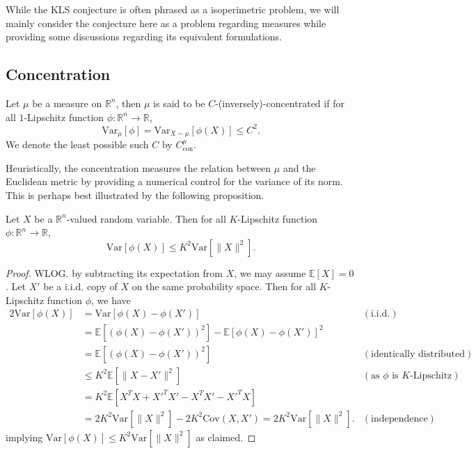 While the KLS conjecture is often phrased as a isoperimetric problem, we will mainly consider the 
conjecture here as a problem regarding measures while providing some discussions regarding its 
equivalent formulations. 

\subsection{Concentration}

\begin{definition}
  Let \(\mu\) be a measure on \(\mathbb{R}^n\), then \(\mu\) is said to be \(C\)-(inversely)-concentrated if
  for all \(1\)-Lipschitz function \(\phi : \mathbb{R}^n \to \mathbb{R}\), 
  \begin{equation}
    \text{Var}_\mu[\phi] = \text{Var}_{X \sim \mu}[\phi(X)] \le C^2.
  \end{equation}
  We denote the least possible such \(C\) by \(C^\mu_{\text{con}}\).
\end{definition}

Heuristically, the concentration measures the relation between \(\mu\) and the Euclidean metric by 
providing a numerical control for the variance of its norm. This is perhaps best illustrated by the following proposition.

\begin{proposition}
  Let \(X\) be a \(\mathbb{R}^n\)-valued random variable. Then for all \(K\)-Lipschitz function 
  \(\phi : \mathbb{R}^n \to \mathbb{R}\),
  \[\text{Var}[\phi(X)] \le K^2 \text{Var}[\|X\|^2].\]
\end{proposition}
\begin{proof}
  WLOG. by subtracting its expectation from \(X\), we may assume \(\mathbb{E}[X] = 0\).
  Let \(X'\) be a i.i.d. copy of \(X\) on the same probability space. Then for all \(K\)-Lipschitz 
  function \(\phi\), we have 
  \begin{align*}
    2 \text{Var}[\phi(X)] & = \text{Var}[\phi(X) - \phi(X')] & (\text{i.i.d.})\\
      & = \mathbb{E}[(\phi(X) - \phi(X'))^2] - \mathbb{E}[\phi(X) - \phi(X')]^2 & \\
      & = \mathbb{E}[(\phi(X) - \phi(X'))^2] & (\text{identically distributed}) \\
      & \le K^2 \mathbb{E}[\|X - X'\|^2] & (\text{as \(\phi\) is \(K\)-Lipschitz}) \\
      & = K^2 \mathbb{E}[X^T X + X'^T X' - X^T X' - X'^T X] & \\
      & = 2K^2 \text{Var}[\|X\|^2] - 2K^2 \text{Cov}(X, X') = 2K^2 \text{Var}[\|X\|^2]. & (\text{independence})
  \end{align*}
  implying \(\text{Var}[\phi(X)] \le K^2 \text{Var}[\|X\|^2]\) as claimed.
\end{proof}

